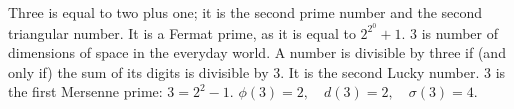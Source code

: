 Three is equal to two plus one; it is the second prime number and
the second triangular number.
It is a Fermat prime, as it is equal to $2^{2^{0}}+1.$ 
3 is number of dimensions of space in the everyday world.
A number is divisible by three if (and only if) the sum of its
digits is divisible by 3.
It is the second Lucky number.
3 is the first Mersenne prime: $3=2^{2}-1.$ 
$ \phi(3)=2, \quad d(3)=2, \quad \sigma(3)=4 . $